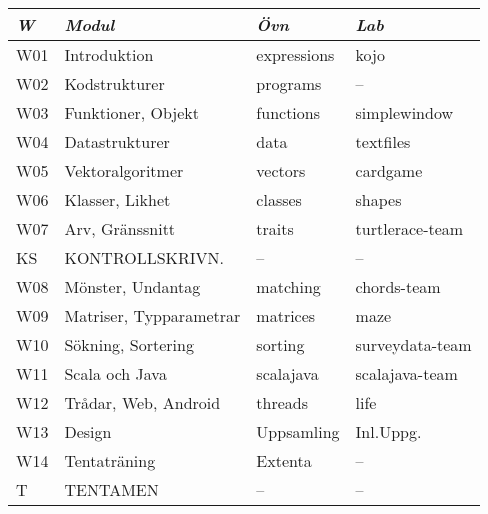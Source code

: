 \begin{tabular}{l|l|l|l}
\textit{W} & \textit{Modul} & \textit{Övn} & \textit{Lab} \\ \hline \hline
W01 & Introduktion            & expressions & kojo            \\
W02 & Kodstrukturer           & programs    & --              \\
W03 & Funktioner, Objekt      & functions   & simplewindow    \\
W04 & Datastrukturer          & data        & textfiles       \\
W05 & Vektoralgoritmer        & vectors     & cardgame        \\
W06 & Klasser, Likhet         & classes     & shapes          \\
W07 & Arv, Gränssnitt         & traits      & turtlerace-team \\
KS  & KONTROLLSKRIVN.         & --          & --              \\
W08 & Mönster, Undantag       & matching    & chords-team     \\
W09 & Matriser, Typparametrar & matrices    & maze            \\
W10 & Sökning, Sortering      & sorting     & surveydata-team \\
W11 & Scala och Java          & scalajava   & scalajava-team  \\
W12 & Trådar, Web, Android    & threads     & life            \\
W13 & Design                  & Uppsamling  & Inl.Uppg.       \\
W14 & Tentaträning            & Extenta     & --              \\
T   & TENTAMEN                & --          & --              \\
\end{tabular}
